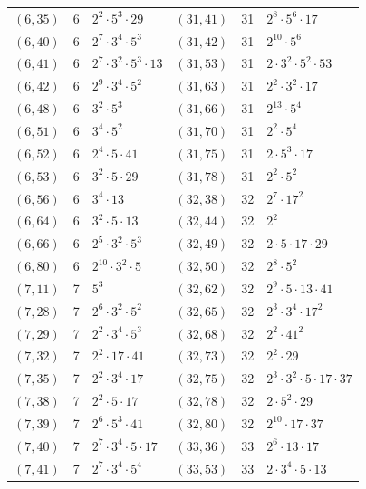 \documentclass[11pt]{article}
\begin{document}
\begin{longtable}{@{}lrl@{\qquad}lrl@{}}
$(6,35)$ & 6 & $2^{2}\cdot 5^{3}\cdot 29$ & $(31,41)$ & 31 & $2^{8}\cdot 5^{6}\cdot 17$\\
$(6,40)$ & 6 & $2^{7}\cdot 3^{4}\cdot 5^{3}$ & $(31,42)$ & 31 & $2^{10}\cdot 5^{6}$\\
$(6,41)$ & 6 & $2^{7}\cdot 3^{2}\cdot 5^{3}\cdot 13$ & $(31,53)$ & 31 & $2\cdot 3^{2}\cdot 5^{2}\cdot 53$\\
$(6,42)$ & 6 & $2^{9}\cdot 3^{4}\cdot 5^{2}$ & $(31,63)$ & 31 & $2^{2}\cdot 3^{2}\cdot 17$\\
$(6,48)$ & 6 & $3^{2}\cdot 5^{3}$ & $(31,66)$ & 31 & $2^{13}\cdot 5^{4}$\\
$(6,51)$ & 6 & $3^{4}\cdot 5^{2}$ & $(31,70)$ & 31 & $2^{2}\cdot 5^{4}$\\
$(6,52)$ & 6 & $2^{4}\cdot 5\cdot 41$ & $(31,75)$ & 31 & $2\cdot 5^{3}\cdot 17$\\
$(6,53)$ & 6 & $3^{2}\cdot 5\cdot 29$ & $(31,78)$ & 31 & $2^{2}\cdot 5^{2}$\\
$(6,56)$ & 6 & $3^{4}\cdot 13$ & $(32,38)$ & 32 & $2^{7}\cdot 17^{2}$\\
$(6,64)$ & 6 & $3^{2}\cdot 5\cdot 13$ & $(32,44)$ & 32 & $2^{2}$\\
$(6,66)$ & 6 & $2^{5}\cdot 3^{2}\cdot 5^{3}$ & $(32,49)$ & 32 & $2\cdot 5\cdot 17\cdot 29$\\
$(6,80)$ & 6 & $2^{10}\cdot 3^{2}\cdot 5$ & $(32,50)$ & 32 & $2^{8}\cdot 5^{2}$\\
$(7,11)$ & 7 & $5^{3}$ & $(32,62)$ & 32 & $2^{9}\cdot 5\cdot 13\cdot 41$\\
$(7,28)$ & 7 & $2^{6}\cdot 3^{2}\cdot 5^{2}$ & $(32,65)$ & 32 & $2^{3}\cdot 3^{4}\cdot 17^{2}$\\
$(7,29)$ & 7 & $2^{2}\cdot 3^{4}\cdot 5^{3}$ & $(32,68)$ & 32 & $2^{2}\cdot 41^{2}$\\
$(7,32)$ & 7 & $2^{2}\cdot 17\cdot 41$ & $(32,73)$ & 32 & $2^{2}\cdot 29$\\
$(7,35)$ & 7 & $2^{2}\cdot 3^{4}\cdot 17$ & $(32,75)$ & 32 & $2^{3}\cdot 3^{2}\cdot 5\cdot 17\cdot 37$\\
$(7,38)$ & 7 & $2^{2}\cdot 5\cdot 17$ & $(32,78)$ & 32 & $2\cdot 5^{2}\cdot 29$\\
$(7,39)$ & 7 & $2^{6}\cdot 5^{3}\cdot 41$ & $(32,80)$ & 32 & $2^{10}\cdot 17\cdot 37$\\
$(7,40)$ & 7 & $2^{7}\cdot 3^{4}\cdot 5\cdot 17$ & $(33,36)$ & 33 & $2^{6}\cdot 13\cdot 17$\\
$(7,41)$ & 7 & $2^{7}\cdot 3^{4}\cdot 5^{4}$ & $(33,53)$ & 33 & $2\cdot 3^{4}\cdot 5\cdot 13$\\

\end{longtable}
\end{document}
